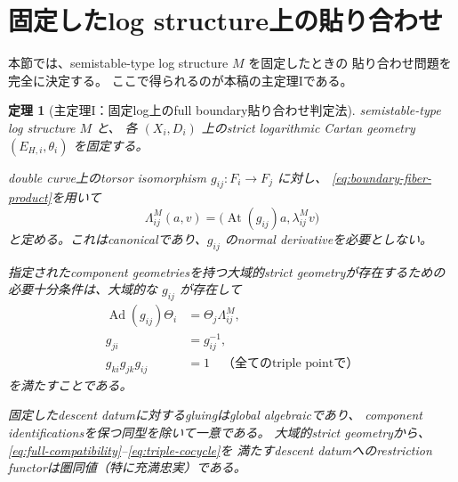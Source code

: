 \documentclass[uplatex,dvipdfmx,11pt]{jsarticle}
\numberwithin{equation}{section}
\theoremstyle{plain}
\newtheorem{theorem}{定理}[section]
\theoremstyle{definition}
\theoremstyle{remark}
\DeclareMathOperator{\At}{At}
\DeclareMathOperator{\Ad}{Ad}
\begin{document}
\section{固定したlog structure上の貼り合わせ}
\label{sec:gluing}

本節では、semistable-type log structure \(M\) を固定したときの
貼り合わせ問題を完全に決定する。
ここで得られるのが本稿の主定理Iである。


\begin{theorem}[主定理I：固定log上のfull boundary貼り合わせ判定法]
\label{thm:fixed-log-gluing}
semistable-type log structure \(M\) と、
各 \((X_i,D_i)\) 上のstrict logarithmic Cartan geometry
\((E_{H,i},\theta_i)\) を固定する。

double curve上のtorsor isomorphism \(g_{ij}:F_i\to F_j\) に対し、
\eqref{eq:boundary-fiber-product}を用いて
\begin{equation}
\label{eq:lambda-atiyah}
\Lambda^M_{ij}(a,v)
=
\bigl(\At(g_{ij})a,\lambda^M_{ij}v\bigr)
\end{equation}
と定める。これはcanonicalであり、\(g_{ij}\) のnormal derivativeを必要としない。

指定されたcomponent geometriesを持つ大域的strict geometryが存在するための
必要十分条件は、大域的な \(g_{ij}\) が存在して
\begin{align}
\Ad(g_{ij})\Theta_i&=\Theta_j\Lambda^M_{ij},
\label{eq:full-compatibility}\\
g_{ji}&=g_{ij}^{-1},
\label{eq:inverse}\\
g_{ki}g_{jk}g_{ij}&=1
\quad\text{（全てのtriple pointで）}
\label{eq:triple-cocycle}
\end{align}
を満たすことである。

固定したdescent datumに対するgluingはglobal algebraicであり、
component identificationsを保つ同型を除いて一意である。
大域的strict geometryから、\eqref{eq:full-compatibility}--\eqref{eq:triple-cocycle}を
満たすdescent datumへのrestriction functorは圏同値（特に充満忠実）である。
\end{theorem}
\end{document}
